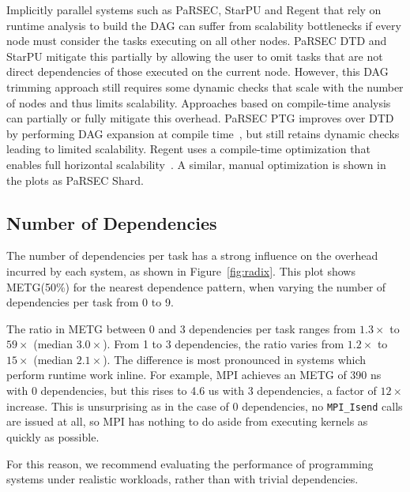 Implicitly parallel systems such as PaRSEC, StarPU and Regent that
rely on runtime analysis to build the DAG can suffer from
scalability bottlenecks if every node must consider the tasks
executing on all other nodes. PaRSEC DTD and StarPU mitigate this
partially by allowing the user to omit tasks that are not direct
dependencies of those executed on the current node. However, this DAG
trimming approach still requires some dynamic checks that scale with
the number of nodes and thus limits scalability. Approaches based on compile-time analysis can
partially or fully mitigate this overhead. PaRSEC PTG improves over DTD 
by performing DAG expansion at compile time~\cite{PARSEC_DTD}, but
still retains dynamic checks leading to limited scalability. Regent
uses a compile-time optimization that enables full horizontal
scalability~\cite{ControlReplication17}. A similar, manual
optimization is shown in the plots as PaRSEC Shard.



\subsection{Number of Dependencies}
\label{subsec:number-of-dependencies}



The number of dependencies per task has a strong influence on the
overhead incurred by each system, as shown in
Figure~\ref{fig:radix}. This plot shows METG(50\%) for the nearest
dependence pattern, when varying the number of dependencies per task
from 0 to 9.


The ratio in METG between 0 and 3 dependencies per task ranges from
$1.3\times$ to $59\times$ (median $3.0\times$). From 1 to 3
dependencies, the ratio varies from $1.2\times$ to $15\times$ (median
$2.1\times$). The difference is most pronounced in systems which
perform runtime work inline. For example, MPI achieves an METG of 390
ns with 0 dependencies, but this rises to 4.6 us with 3 dependencies,
a factor of $12\times$ increase. This is unsurprising as in the case
of 0 dependencies, no \lstinline[language=C++]{MPI_Isend} calls are
issued at all, so MPI has nothing to do aside from executing kernels
as quickly as possible.

For this reason, we recommend evaluating the performance of
programming systems under realistic workloads, rather than with
trivial dependencies.

